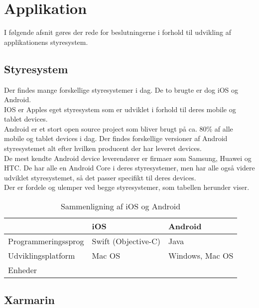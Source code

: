\chapter{Applikation}
I følgende afsnit gøres der rede for beslutningerne i forhold til udvikling af applikationens styresystem.

\section{Styresystem}
Der findes mange forskellige styresystemer i dag. De to brugte er dog iOS og Android. \\
IOS er Apples eget styresystem som er udviklet i forhold til deres mobile og tablet devices. \\
Android er et stort open source project som bliver brugt på ca. 80\% af alle mobile og tablet devices i dag. Der findes forskellige versioner af Android styresystemet alt efter hvilken producent der har leveret devices. \\
De mest kendte Android device leverendører er firmaer som Samsung, Huawei og HTC. De har alle en Android Core i deres styresystemer, men har alle også videre udviklet styresystemet, så det passer specifikt til deres devices. \\

Der er fordele og ulemper ved begge styresystemer, som tabellen herunder viser. \\


\begin{table} [H]
	\centering
	\begin{tabular}{ | m{10em} | m{10em}| m{10em} | } 
		\hline
		& iOS & Android   \\ 
		\hline
		Programmeringssprog  & Swift (Objective-C) & Java \\ 
		\hline
		Udviklingsplatform & Mac OS & Windows, Mac OS \\ 
		\hline
		Enheder & & \\
		\hline
	\end{tabular}
	\caption{Sammenligning af iOS og Android}
	\label{StyresystemTabel}
\end{table}


\section{Xarmarin}





